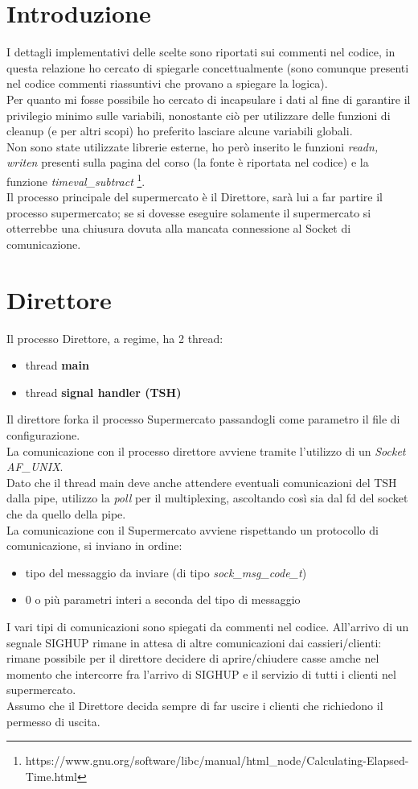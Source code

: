 \documentclass[11pt, a4paper]{article}
\begin{document}
\section{Introduzione}
I dettagli implementativi delle scelte sono riportati sui commenti nel codice, in questa relazione ho cercato di spiegarle concettualmente (sono comunque presenti nel codice commenti riassuntivi che provano a spiegare la logica).\\
Per quanto mi fosse possibile ho cercato di incapsulare i dati al fine di garantire il privilegio minimo sulle variabili, nonostante ciò per utilizzare delle funzioni di cleanup (e per altri scopi) ho preferito lasciare alcune variabili globali.\\
Non sono state utilizzate librerie esterne, ho però inserito le funzioni \textit{readn, writen} presenti sulla pagina del corso (la fonte è riportata nel codice) e la funzione \textit{timeval\_subtract} \footnote{https://www.gnu.org/software/libc/manual/html\_node/Calculating-Elapsed-Time.html}.\\

Il processo principale del supermercato è il Direttore, sarà lui a far partire il processo supermercato; se si dovesse eseguire solamente il supermercato si otterrebbe una chiusura dovuta alla mancata connessione al Socket di comunicazione.
\section{Direttore}
Il processo Direttore, a regime, ha 2 thread:
\begin{itemize}
\item thread \textbf{main} 
\item thread \textbf{signal handler (TSH)}
\end{itemize}
Il direttore forka il processo Supermercato passandogli come parametro il file di configurazione.\\
La comunicazione con il processo direttore avviene tramite l'utilizzo di un \textit{Socket AF\_UNIX}.\\
Dato che il thread main deve anche attendere eventuali comunicazioni del TSH dalla pipe, utilizzo la \textit{poll} per il multiplexing, ascoltando così sia dal fd del socket che da quello della pipe.\\
La comunicazione con il Supermercato avviene rispettando un protocollo di comunicazione, si inviano in ordine:
\begin{itemize}
\item tipo del messaggio da inviare (di tipo \textit{sock\_msg\_code\_t})
\item 0 o più parametri interi a seconda del tipo di messaggio\\
\end{itemize}
I vari tipi di comunicazioni sono spiegati da commenti nel codice.
All'arrivo di un segnale SIGHUP rimane in attesa di altre comunicazioni dai cassieri/clienti: rimane possibile per il direttore decidere di aprire/chiudere casse amche nel momento che intercorre fra l'arrivo di SIGHUP e il servizio di tutti i clienti nel supermercato.\\
Assumo che il Direttore decida sempre di far uscire i clienti che richiedono il permesso di uscita.
\end{document}
